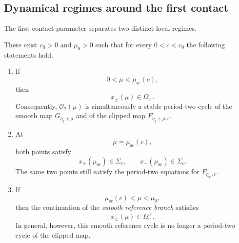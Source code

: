 \subsection{Dynamical regimes around the first contact}
\label{subsec:regimes-around-contact}

The first-contact parameter separates two distinct local regimes.

\begin{proposition}
\label{prop:precontact-contact-regimes}
There exist $c_0>0$ and $\mu_0>0$ such that for every
$0<c<c_0$ the following statements hold.

\begin{enumerate}[label=\textnormal{(\roman*)}]

\item
If
\[
0<\mu<\mu_{\mathrm{sc}}(c),
\]
then
\begin{equation}
x_\pm(\mu)\in\Omega_c^-.
\label{eq:precontact-smooth}
\end{equation}
Consequently,
$\mathcal O_2(\mu)$ is simultaneously a stable period-two cycle of
the smooth map $G_{\eta_f+\mu}$ and of the clipped map
$F_{\eta_f+\mu,c}$.

\item
At
\[
\mu=\mu_{\mathrm{sc}}(c),
\]
both points satisfy
\begin{equation}
x_+(\mu_{\mathrm{sc}})
\in\Sigma_c,
\qquad
x_-(\mu_{\mathrm{sc}})
\in\Sigma_c.
\label{eq:both-on-switching}
\end{equation}
The same two points still satisfy the period-two equations for
$F_{\eta_{\mathrm{sc}},c}$.

\item
If
\[
\mu_{\mathrm{sc}}(c)<\mu<\mu_0,
\]
then the continuation of the \emph{smooth reference branch}
satisfies
\begin{equation}
x_\pm(\mu)\in\Omega_c^+.
\label{eq:postcontact-reference-clipped}
\end{equation}
In general, however, this smooth reference cycle is no longer a
period-two cycle of the clipped map.

\end{enumerate}
\end{proposition}

